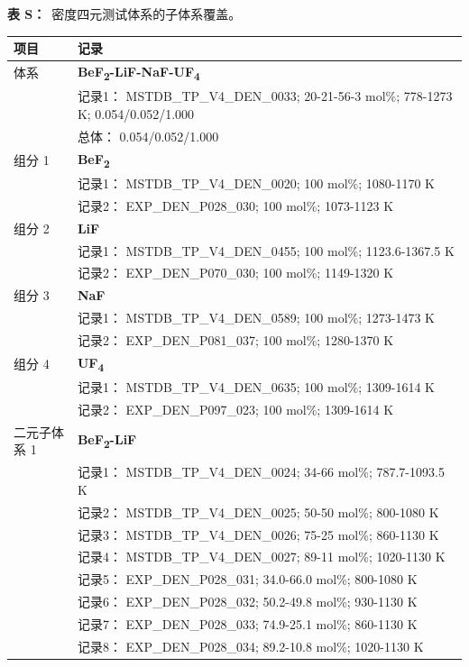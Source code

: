 \documentclass[12pt]{article}
\renewcommand{\thetable}{S\arabic{table}}
\newcommand{\sitablecaption}[1]{\Needspace{12\baselineskip}\par\noindent\stepcounter{table}\textbf{表 \thetable：}~#1\par\nobreak\smallskip}
\newcommand{\silongtablecaption}[1]{\sitablecaption{#1}\addtocounter{table}{-1}}
\begin{document}
{
\silongtablecaption{密度四元测试体系的子体系覆盖。}
\begin{longtable}[]{@{}
  >{\raggedright\arraybackslash}p{}
  >{\raggedright\arraybackslash}p{}@{}}
\toprule\noalign{}
\begin{minipage}[b]{\linewidth}\raggedright
项目
\end{minipage} & \begin{minipage}[b]{\linewidth}\raggedright
记录
\end{minipage} \\
\midrule\noalign{}
\endhead
\bottomrule\noalign{}
\endlastfoot
体系 & \textbf{BeF\textsubscript{2}-LiF-NaF-UF\textsubscript{4}} \\
 & 记录1： MSTDB\_TP\_V4\_DEN\_0033; 20-21-56-3 mol\%; 778-1273 K; 0.054/0.052/1.000 \\
 & 总体： 0.054/0.052/1.000  \\

组分 1  & \textbf{BeF\textsubscript{2}} \\
 & 记录1： MSTDB\_TP\_V4\_DEN\_0020; 100 mol\%; 1080-1170 K \\
 & 记录2： EXP\_DEN\_P028\_030; 100 mol\%; 1073-1123 K  \\

组分 2  & \textbf{LiF} \\
 & 记录1： MSTDB\_TP\_V4\_DEN\_0455; 100 mol\%; 1123.6-1367.5 K \\
 & 记录2： EXP\_DEN\_P070\_030; 100 mol\%; 1149-1320 K  \\

组分 3  & \textbf{NaF} \\
 & 记录1： MSTDB\_TP\_V4\_DEN\_0589; 100 mol\%; 1273-1473 K \\
 & 记录2： EXP\_DEN\_P081\_037; 100 mol\%; 1280-1370 K  \\

组分 4  & \textbf{UF\textsubscript{4}} \\
 & 记录1： MSTDB\_TP\_V4\_DEN\_0635; 100 mol\%; 1309-1614 K \\
 & 记录2： EXP\_DEN\_P097\_023; 100 mol\%; 1309-1614 K  \\

二元子体系 1  & \textbf{BeF\textsubscript{2}-LiF} \\
 & 记录1： MSTDB\_TP\_V4\_DEN\_0024; 34-66 mol\%; 787.7-1093.5 K \\
 & 记录2： MSTDB\_TP\_V4\_DEN\_0025; 50-50 mol\%; 800-1080 K \\
 & 记录3： MSTDB\_TP\_V4\_DEN\_0026; 75-25 mol\%; 860-1130 K \\
 & 记录4： MSTDB\_TP\_V4\_DEN\_0027; 89-11 mol\%; 1020-1130 K \\
 & 记录5： EXP\_DEN\_P028\_031; 34.0-66.0 mol\%; 800-1080 K \\
 & 记录6： EXP\_DEN\_P028\_032; 50.2-49.8 mol\%; 930-1130 K \\
 & 记录7： EXP\_DEN\_P028\_033; 74.9-25.1 mol\%; 860-1130 K \\
 & 记录8： EXP\_DEN\_P028\_034; 89.2-10.8 mol\%; 1020-1130 K  \\


\end{longtable}}
\end{document}
